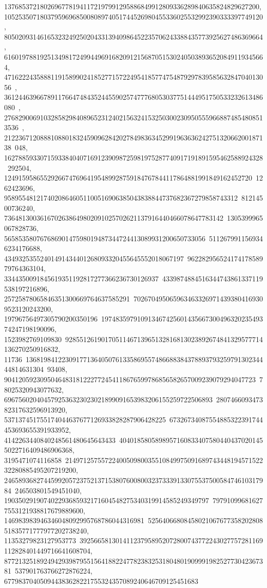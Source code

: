 {{{   13768537218026967781941172197991295886849912809336289840635824829627200, 
   105253507180379596968500808974051744526980455336025532992390333397749120, 
   805020931461653232492502043313940986452235706243388435773925627486369664, 
   6160197881925134981724994496916820912156870515302405038936520849119345664, 
   47162224358881191589902418527715722495418577475487929783958563284704013056\
, 
   361244639667891176647484352445590257477768053037751444951750533232613486080\
, 
   2768290069103285829840896523124021563241532503002309505559668874854808513536\
, 
   21223671208881088018324590962842027849836345299196363624275132066200187138\
048, 162788593307159338404071691239098725981975287740917191891595462588924328\
292504, 124915958655292667476964195489928759184767844117864881991849162452720\
1262423696, 95895548121740208646051100516906385043838844737682367279858743312\
81214500736240, 7364813003616702638649802091025702621137916440466078647783142\
1305399965067828736, 56585358076768690147598019487344724413089931200650733056\
5112679911569346234176688, 43493253552401491434401268093320455645552018067197\
96228295652417417858979764363104, 3344350091845619351192817277366236730126937\
4339874884516344743861337119538197216896, 25725878065846351300669764637585291\
7026704950659634633269714393804169309523120243200, 19796756497305790200350196\
19748359791091346742560143566730049632023549374247198190096, 1523982769109830\
9285512619017051146713965132816813023892674841329577714136270250916832, 11736\
13681984122309177136405076133586955748668838437889379325979130234444814631304\
93408, 9041205923095046483181222772454118676599786856582657009239079294047723\
78025320943077632, 6967560204045792536323023021899091653983206155259722506893\
280746609347382317632596913920, 537137451755174044637677126933828287906428225\
67326734087554885322391744453693655391933952, 4142263440840248561480645643433\
40401858058989571608334075804404370201455022716409486906368, 3195471074116858\
214971257557224005098003551084997509168974344819457152232280885495207219200, 
   24658936827445992057237521371538076008003237333913307553750058474610317984\
246503801549451040, 190350291907402293685932171604548275340319914585249349797\
797910996816277553121938817679889600, 146983983946346048092995768786044316981\
5256406680845802106767735820280851835771777977202738240, 11353279823127953773\
392566581301411237958952072800743772243027757281169112828401449716641608704, 
   87721325189249429398795515641882247782383253180480190999198252773042367381\
537901763766272876224, 677983704050944383628221755324357089240646709125451683\
}}}
